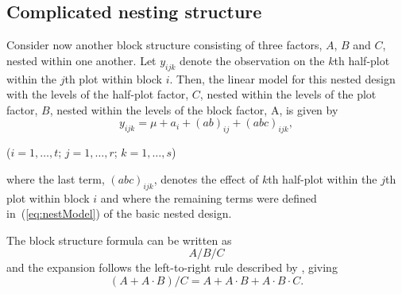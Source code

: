 \documentclass[article]{jss}
\begin{document}
\subsection{Complicated nesting structure}
Consider now another block structure consisting of three factors, $A$, $B$ and $C$, nested within one another. Let $y_{ijk}$ denote the observation on the $k$th half-plot within the $j$th plot within block $i$. Then, the linear model for this nested design with the levels of the half-plot factor, $C$, nested within the levels of the plot factor, $B$, nested within the levels of the block factor, A, is given by
\begin{equation}\label{eq:complexNestModel}
y_{ijk}= \mu + a_{i} + (ab)_{ij} + (abc)_{ijk},
\end{equation}
\begin{center}
($i=1,\dots ,t$; $j=1,\dots,r$; $k=1,\dots,s$)
\end{center}
where the last term, $(abc)_{ijk}$, denotes the effect of $k$th half-plot within the $j$th plot within block $i$ and where the remaining terms were defined in~(\ref{eq:nestModel}) of the basic nested design.

The block structure formula can be written as
\begin{equation}\label{eq:complexNest2}
A/B/C
\end{equation}
and the expansion follows the left-to-right rule described by \cite{Wilkinson1973}, giving
\begin{equation}\label{eq:expandComplexNest2}
(A + A\cdot B)/C = A + A\cdot B + A\cdot B\cdot C.
\end{equation}
\end{document}
